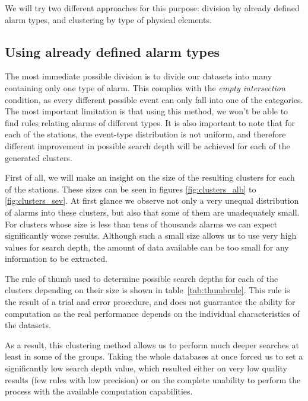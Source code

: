 We will try two different approaches for this purpose: division by already defined alarm types, and clustering by type of physical elements.

\subsection{Using already defined alarm types}
\label{sec:using_event_type}
The most immediate possible division is to divide our datasets into many containing only one type of alarm. This complies with the \emph{empty intersection} condition, as every different possible event can only fall into one of the categories. The most important limitation is that using this method, we won't be able to find rules relating alarms of different types. It is also important to note that for each of the stations, the event-type distribution is not uniform, and therefore different improvement in possible search depth will be achieved for each of the generated clusters.

First of all, we will make an insight on the size of the resulting clusters for each of the stations. These sizes can be seen in figures \ref{fig:clusters_alb} to \ref{fig:clusters_sev}. At first glance we observe not only a very unequal distribution of alarms into these clusters, but also that some of them are unadequately small. For clusters whose size is less than tens of thousands alarms we can expect significantly worse results. Although such a small size allows us to use very high values for search depth, the amount of data available can be too small for any information to be extracted.

The rule of thumb used to determine possible search depths for each of the clusters depending on their size is shown in table~\ref{tab:thumbrule}. This rule is the result of a trial and error procedure, and does not guarrantee the ability for computation as the real performance depends on the individual characteristics of the datasets.

As a result, this clustering method allows us to perform much deeper searches at least in some of the groups. Taking the whole databases at once forced us to set a significantly low search depth value, which resulted either on very low quality results (few rules with low precision) or on the complete unability to perform the process with the available computation capabilities.

